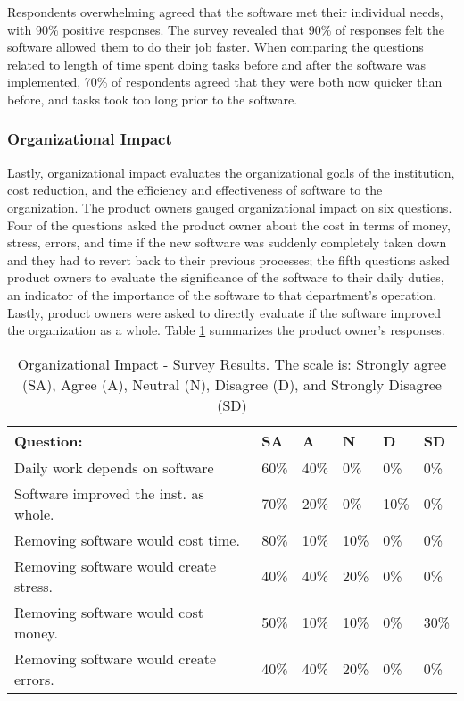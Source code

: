 Respondents overwhelming agreed that the software met their individual needs, with 90\% positive responses. The survey revealed that 90\% of responses felt the software allowed them to do their job faster. When comparing the questions related to length of time spent doing tasks before and after the software was implemented, 70\% of respondents agreed that they were both now quicker than before, and tasks took too long prior to the software. %


\subsubsection{Organizational Impact}
Lastly, organizational impact evaluates the organizational goals of the institution, cost reduction, and the efficiency and effectiveness of software to the organization. The product owners gauged organizational impact on six questions. Four of the questions asked the product owner about the cost in terms of money, stress, errors, and time if the new software was suddenly completely taken down and they had to revert back to their previous processes; the fifth questions asked product owners to evaluate the significance of the software to their daily duties, an indicator of the importance of the software to that department's operation. Lastly, product owners were asked to directly evaluate if the software improved the organization as a whole. Table \ref{table:orgImpact} summarizes the product owner's responses.


\begin{table}
\caption{Organizational Impact - Survey Results. The scale is: Strongly agree (SA), Agree (A), Neutral (N), Disagree (D), and Strongly Disagree (SD)}
\label{table:orgImpact}
\begin{tabular}{p{4.3cm}p{.4cm}p{.4cm}p{.4cm}p{.4cm}p{.4cm}}
Question: & SA & A & N & D & SD \\
\hline
Daily work depends on software & 60\% & 40\% & 0\% & 0\% & 0\% \\
Software improved the inst. as whole. & 70\% & 20\% & 0\% & 10\% & 0\% \\
Removing software would cost time. & 80\% & 10\% & 10\% & 0\% & 0\% \\
Removing software would create stress. & 40\% & 40\% & 20\% & 0\% & 0\% \\
Removing software would cost money. & 50\% & 10\% & 10\% & 0\% & 30\% \\
Removing software would create errors. & 40\% & 40\% & 20\% & 0\% & 0\% \\
\end{tabular}
\end{table}


